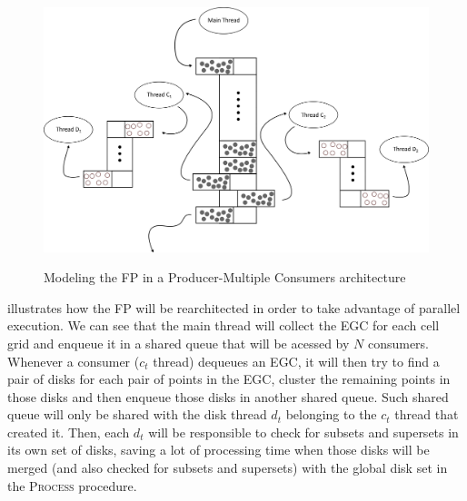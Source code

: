 \begin{figure}[h!]
    \centering
    \caption{Modeling the FP in a Producer-Multiple Consumers architecture}
    \includegraphics[width=\linewidth]{images/multithread.png}
    \label{fig:multithread}
\end{figure}

 illustrates how the FP will be rearchitected in order to take advantage of parallel execution.
We can see that the main thread will collect the EGC for each cell grid and enqueue it in a shared queue that will be
acessed by $N$ consumers. Whenever a consumer ($c_t$ thread) dequeues an EGC, it will then try to find a pair of disks
for each pair of points in the EGC, cluster the remaining points in those disks and then enqueue those disks in another
shared queue. Such shared queue will only be shared with the disk thread $d_t$ belonging to the $c_t$ thread that
created it. Then, each $d_t$ will be responsible to check for subsets and supersets in its own set of disks, saving a
lot of processing time when those disks will be merged (and also checked for subsets and supersets) with the global disk
set in the \textsc{Process} procedure.
